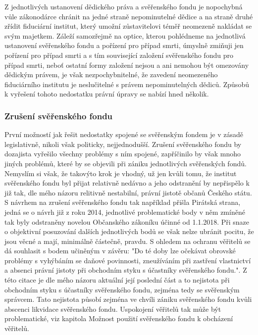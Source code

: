 \documentclass{article}
\begin{document}
Z jednotlivých ustanovení dědického práva a svěřenského fondu je nopochybná vůle zákonodárce chránit na jedné straně nepominutelné dědice a na straně druhé zřídit fiduciární institut, který umožní zůstavitelovi téměř neomezeně nakládat se svým majetkem. Záleží samozřejmě na optice, kterou pohlédneme na jednotlivá ustanovení svěřenského fondu a pořízení pro případ smrti, úmyslně zmiňuji jen pořízení pro případ smrti a s tím související založení svěřenského fondu pro případ smrti, neboť ostatní formy založení nejsou a ani nemohou být omezovány dědickým právem, je však nezpochybnitelné, že zavedení neomezeného fiduciárního institutu je neslučitelné s právem nepominutelných dědiců. Způsobů k vyřešení tohoto nedostatku právní úpravy se nabízí hned několik.\\

\subsubsection{Zrušení svěřenského fondu}

První možností jak řešit nedostatky spojené se svěřenským fondem je v zásadě legislativně, nikoli však politicky, nejjednodušší. Zrušení svěřenského fondu by dozajista vyřešilo všechny problémy s ním spojené, zapříčinilo by však mnoho jiných problémů, které by se objevili při zániku jednotlivých svěřenských fondů.\\

Nemyslím si však, že takovýto krok je vhodný, už jen kvůli tomu, že institut svěřenského fondu byl přijat relativně nedávno a jeho odstranění by nepřispělo k již tak, dle mého názoru relitivně nestabilní, právní jistotě občanů Českého státu.\\

S návrhem na zrušení svěřenského fondu tak například přišla Pirátská strana, jedná se o návrh již z roku 2014, jednotlivé problematické body v něm zmíněné tak byly odstraněny novelou Občanského zákoníku účinné od 1.1.2018. Při snaze o objektivní posuzování dalších jednotlivých bodů se však nelze ubránit pocitu, že jsou věcné a mají, minimálně částečně, pravdu. S ohledem na ochranu věřitelů se dá souhlasit s bodem učiněným v závěru: "Do té doby lze očekávat obrovské problémy s vyhýbáním se daňové povinnosti, zneužíváním při zastření vlastnictví a absenci právní jistoty při obchodním styku s účastníky svěřenského fondu.". Z této citace je dle mého názoru aktuální její poslední část a to nejistota při obchodním styku s účastníky svěřenského fondu, zejména tedy se svěřenským správcem. Tato nejistota působí zejména ve chvíli zániku svěřenského fondu kvůli abscenci likvidace svěřenského fondu. Uspokojení věřitelů tak může být problematické, viz kapitola Možnost použití svěřenského fondu k obcházení věřitelů.\\ 
\end{document}
